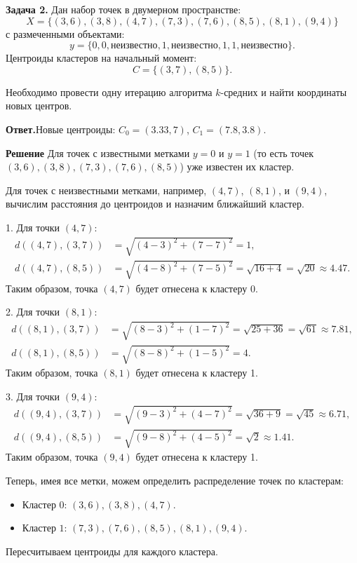 \textbf{Задача 2.} 
Дан набор точек в двумерном пространстве:
\[
X = \{(3, 6), (3, 8), (4, 7), (7, 3), (7, 6), (8, 5), (8, 1), (9, 4)\}
\]
с размеченными объектами:
\[
y = \{0, 0, \text{неизвестно}, 1, \text{неизвестно}, 1, 1, \text{неизвестно}\}.
\]
Центроиды кластеров на начальный момент:
\[
C = \{(3, 7), (8, 5)\}.
\]

Необходимо провести одну итерацию алгоритма \(k\)-средних  и найти координаты новых центров.

\textbf{Ответ.}Новые центроиды: \(C_0 = (3.33, 7)\), \(C_1 = (7.8, 3.8)\).

\textbf{Решение}
Для точек с известными метками \(y = 0\) и \(y = 1\) (то есть точек \((3, 6), (3, 8), (7, 3), (7, 6), (8, 5)\)) уже известен их кластер.

Для точек с неизвестными метками, например, \((4, 7)\), \((8, 1)\), и \((9, 4)\), вычислим расстояния до центроидов и назначим ближайший кластер.

1. Для точки \((4, 7)\):
\[
\begin{aligned}
d((4, 7), (3, 7)) &= \sqrt{(4-3)^2 + (7-7)^2} = 1, \\ d((4, 7), (8, 5)) &= \sqrt{(4-8)^2 + (7-5)^2} = \sqrt{16 + 4} = \sqrt{20} \approx 4.47.
\end{aligned}
\]
Таким образом, точка \((4, 7)\) будет отнесена к кластеру 0.

2. Для точки \((8, 1)\):
\[
\begin{aligned}
d((8, 1), (3, 7)) &= \sqrt{(8-3)^2 + (1-7)^2} = \sqrt{25 + 36} = \sqrt{61} \approx 7.81, \\
d((8, 1), (8, 5)) &= \sqrt{(8-8)^2 + (1-5)^2} = 4.
\end{aligned}
\]
Таким образом, точка \((8, 1)\) будет отнесена к кластеру 1.

3. Для точки \((9, 4)\):
\[
\begin{aligned}
d((9, 4), (3, 7)) &= \sqrt{(9-3)^2 + (4-7)^2} = \sqrt{36 + 9} = \sqrt{45} \approx 6.71, \\
d((9, 4), (8, 5)) &= \sqrt{(9-8)^2 + (4-5)^2} = \sqrt{2} \approx 1.41.
\end{aligned}
\]
Таким образом, точка \((9, 4)\) будет отнесена к кластеру 1.

Теперь, имея все метки, можем определить распределение точек по кластерам:
\begin{itemize}
    \item Кластер \(0\): \((3, 6), (3, 8), (4, 7)\).
    \item Кластер \(1\): \((7, 3), (7, 6), (8, 5), (8, 1), (9, 4)\).
\end{itemize}
Пересчитываем центроиды для каждого кластера.

